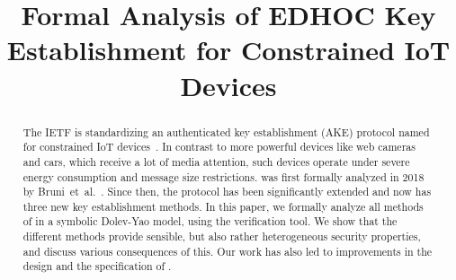 \documentclass[runningheads, envcountsame, hidelinks, a4paper, x11names]{llncs}
\begin{document}
\title{Formal Analysis of EDHOC Key Establishment for Constrained IoT Devices}
%
\author{}
%
%
\authorrunning{}
%
\institute{}
%
\maketitle
%

\begin{abstract}
The IETF is standardizing an authenticated key establishment (AKE) protocol
named \mEdhoc{} for constrained IoT devices~\cite{selander-lake-edhoc-01}.
%
In contrast to more powerful devices like web cameras and cars, which receive a
lot of media attention, such devices operate under severe energy consumption
and message size restrictions.
%
\mEdhoc{} was first formally analyzed in 2018 by
Bruni~et~al.~\cite{DBLP:conf/secsr/BruniJPS18}.
%
Since then, the protocol has been significantly extended and now has three new
key establishment methods.
%
In this paper, we formally analyze all methods of \mEdhoc{} in a symbolic
Dolev-Yao model, using the \mTamarin{} verification tool.
%
We show that the different methods provide sensible, but also rather
heterogeneous security properties, and discuss various consequences of this.
%
Our work has also led to improvements in the design and the specification of
\mEdhoc.
%
\end{abstract}
%

\end{document}

